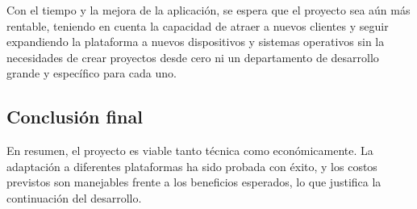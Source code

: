 Con el tiempo y la mejora de la aplicación, se espera que el proyecto sea aún más rentable, teniendo en cuenta la capacidad de atraer
a nuevos clientes y seguir expandiendo la plataforma a nuevos dispositivos y sistemas operativos sin la necesidades de crear 
proyectos desde cero ni un departamento de desarrollo grande y específico para cada uno.

\subsection{Conclusión final}   
\label{subsec:analisis_estudio_viabilidad_conclusion}

En resumen, el proyecto es viable tanto técnica como económicamente. La adaptación a diferentes plataformas 
ha sido probada con éxito, y los costos previstos son manejables frente a los beneficios esperados, lo que 
justifica la continuación del desarrollo.
